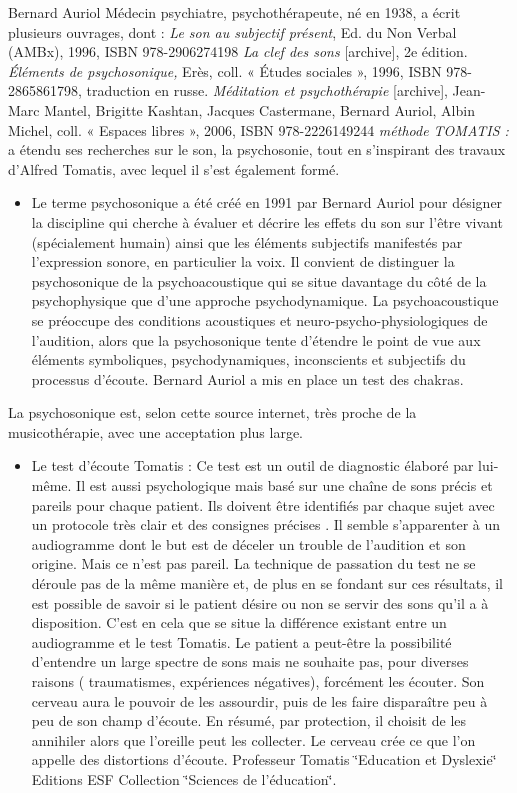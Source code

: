 \documentclass[12pt,french]{report}
\makeatletter
\let\SF@@footnote\footnote
\def\footnote{\ifx\protect\@typeset@protect
    \expandafter\SF@@footnote
  \else
    \expandafter\SF@gobble@opt
  \fi
}
\edef\SF@gobble@opt{\noexpand\protect
  \expandafter\noexpand\csname SF@gobble@opt \endcsname}
\makeatother
\begin{document}
Bernard Auriol\footnote{Médecin psychiatre, psychothérapeute, né en 1938, a écrit plusieurs
ouvrages, dont : \emph{Le son au subjectif présent}, Ed. du Non Verbal
(AMBx), 1996, ISBN 978-2906274198\emph{ La clef des sons} {[}archive{]},
2e édition. \emph{Éléments de psychosonique,} Erès, coll. « Études
sociales », 1996, ISBN 978-2865861798, traduction en russe. \emph{Méditation
et psychothérapie} {[}archive{]}, Jean-Marc Mantel, Brigitte Kashtan,
Jacques Castermane, Bernard Auriol, Albin Michel, coll. « Espaces
libres », 2006, ISBN 978-2226149244\emph{ méthode TOMATIS :} }a étendu ses recherches sur le son, la psychosonie, tout en s'inspirant
des travaux d'Alfred Tomatis, avec lequel il s'est également formé.
\begin{itemize}
\item Le terme psychosonique a été créé en 1991 par Bernard Auriol pour
désigner la discipline qui cherche à évaluer et décrire les effets
du son sur l'être vivant (spécialement humain) ainsi que les éléments
subjectifs manifestés par l'expression sonore, en particulier la voix.
Il convient de distinguer la psychosonique de la psychoacoustique
qui se situe davantage du côté de la psychophysique que d'une approche
psychodynamique. La psychoacoustique se préoccupe des conditions acoustiques
et neuro-psycho-physiologiques de l'audition, alors que la psychosonique
tente d'étendre le point de vue aux éléments symboliques, psychodynamiques,
inconscients et subjectifs du processus d'écoute. Bernard Auriol a
mis en place un test des chakras.
\end{itemize}
La psychosonique est, selon cette source internet, très proche de
la musicothérapie, avec une acceptation plus large. 
\begin{itemize}
\item Le test d'écoute Tomatis : Ce test est un outil de diagnostic élaboré
par lui-même. Il est aussi psychologique mais basé sur une chaîne
de sons précis et pareils pour chaque patient. Ils doivent être identifiés
par chaque sujet avec un protocole très clair et des consignes précises
. Il semble s'apparenter à un audiogramme dont le but est de déceler
un trouble de l'audition et son origine. Mais ce n'est pas pareil.
La technique de passation du test ne se déroule pas de la même manière
et, de plus en se fondant sur ces résultats, il est possible de savoir
si le patient désire ou non se servir des sons qu'il a à disposition.
C'est en cela que se situe la différence existant entre un audiogramme
et le test Tomatis. Le patient a peut-être la possibilité d'entendre
un large spectre de sons mais ne souhaite pas, pour diverses raisons
( traumatismes, expériences négatives), forcément les écouter. Son
cerveau aura le pouvoir de les assourdir, puis de les faire disparaître
peu à peu de son champ d'écoute. En résumé, par protection, il choisit
de les annihiler alors que l'oreille peut les collecter. Le cerveau
crée ce que l'on appelle des distortions d'écoute. \footnote{Professeur Tomatis \char`\"{}Education et Dyslexie\char`\"{} Editions
ESF Collection \char`\"{}Sciences de l'éducation\char`\"{}.}
\end{itemize}
\end{document}
